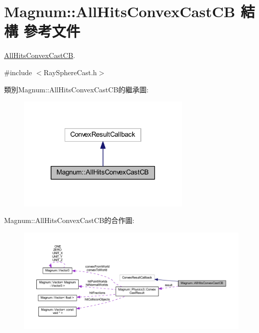 \hypertarget{struct_magnum_1_1_all_hits_convex_cast_c_b}{}\section{Magnum\+:\+:All\+Hits\+Convex\+Cast\+CB 結構 參考文件}
\label{struct_magnum_1_1_all_hits_convex_cast_c_b}


\hyperlink{struct_magnum_1_1_all_hits_convex_cast_c_b}{All\+Hits\+Convex\+Cast\+CB}.  




{\ttfamily \#include $<$Ray\+Sphere\+Cast.\+h$>$}



類別\+Magnum\+:\+:All\+Hits\+Convex\+Cast\+C\+B的繼承圖\+:\nopagebreak
\begin{figure}[H]
\begin{center}
\leavevmode
\includegraphics[width=234pt]{struct_magnum_1_1_all_hits_convex_cast_c_b__inherit__graph}
\end{center}
\end{figure}


Magnum\+:\+:All\+Hits\+Convex\+Cast\+C\+B的合作圖\+:\nopagebreak
\begin{figure}[H]
\begin{center}
\leavevmode
\includegraphics[width=350pt]{struct_magnum_1_1_all_hits_convex_cast_c_b__coll__graph}
\end{center}
\end{figure}
